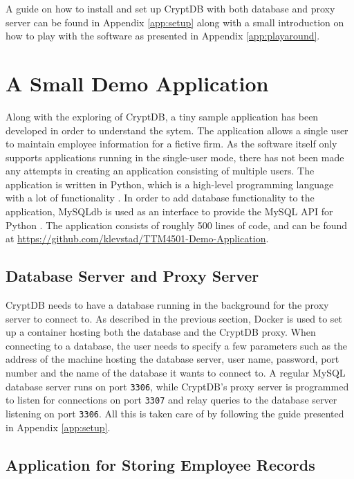 A guide on how to install and set up CryptDB with both database and proxy server can be found in Appendix \ref{app:setup} along with a small introduction on how to play with the software as presented in Appendix \ref{app:playaround}.


\section{A Small Demo Application}

Along with the exploring of CryptDB, a tiny sample application has been developed in order to understand the sytem. The application allows a single user to maintain employee information for a fictive firm. As the software itself only supports applications running in the single-user mode, there has not been made any attempts in creating an application consisting of multiple users. The application is written in Python, which is a high-level programming language with a lot of functionality \cite{python}. In order to add database functionality to the application, MySQLdb is used as an interface to provide the MySQL API for Python \cite{mysqldb}. The application consists of roughly 500 lines of code, and can be found at \url{https://github.com/klevstad/TTM4501-Demo-Application}.

\subsection{Database Server and Proxy Server}

CryptDB needs to have a database running in the background for the proxy server to connect to. As described in the previous section, Docker is used to set up a container hosting both the database and the CryptDB proxy. When connecting to a database, the user needs to specify a few parameters such as the address of the machine hosting the database server, user name, password, port number and the name of the database it wants to connect to. A regular MySQL database server runs on port \verb!3306!, while CryptDB's proxy server is programmed to listen for connections on port \verb!3307! and relay queries to the database server listening on port \verb!3306!. All this is taken care of by following the guide presented in Appendix \ref{app:setup}.

\subsection{Application for Storing Employee Records}

